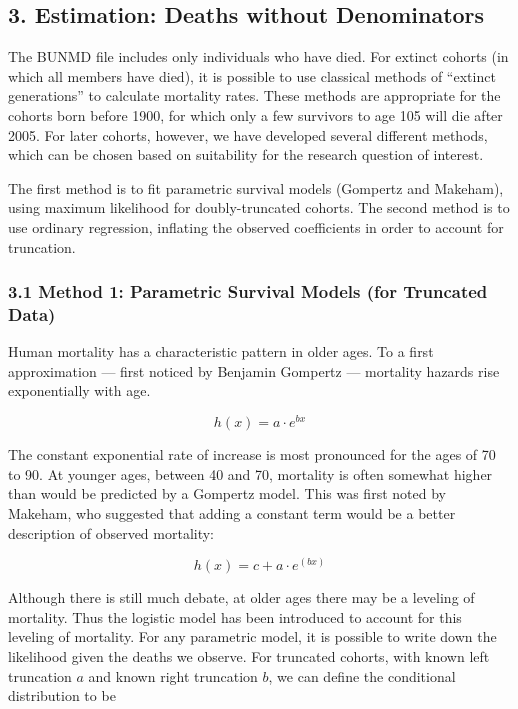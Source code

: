 \documentclass[
  11pt,
]{article}
\begin{document}
\hypertarget{estimation-deaths-without-denominators}{%
\subsection{3. Estimation: Deaths without
Denominators}\label{estimation-deaths-without-denominators}}

The BUNMD file includes only individuals who have died. For extinct
cohorts (in which all members have died), it is possible to use
classical methods of ``extinct generations'' to calculate mortality
rates. These methods are appropriate for the cohorts born before 1900,
for which only a few survivors to age 105 will die after 2005. For later
cohorts, however, we have developed several different methods, which can
be chosen based on suitability for the research question of interest.

The first method is to fit parametric survival models (Gompertz and
Makeham), using maximum likelihood for doubly-truncated cohorts. The
second method is to use ordinary regression, inflating the observed
coefficients in order to account for truncation.

\hypertarget{method-1-parametric-survival-models-for-truncated-data}{%
\subsubsection{3.1 Method 1: Parametric Survival Models (for Truncated
Data)}\label{method-1-parametric-survival-models-for-truncated-data}}

Human mortality has a characteristic pattern in older ages. To a first
approximation --- first noticed by Benjamin Gompertz --- mortality
hazards rise exponentially with age.

\begin{equation}
h(x) = a \cdot e^{bx}
\end{equation}

The constant exponential rate of increase is most pronounced for the
ages of 70 to 90. At younger ages, between 40 and 70, mortality is often
somewhat higher than would be predicted by a Gompertz model. This was
first noted by Makeham, who suggested that adding a constant term would
be a better description of observed mortality:

\begin{equation}
h(x) = c + a \cdot e^{(bx)}
\end{equation}

Although there is still much debate, at older ages there may be a
leveling of mortality. Thus the logistic model has been introduced to
account for this leveling of mortality. For any parametric model, it is
possible to write down the likelihood given the deaths we observe. For
truncated cohorts, with known left truncation \(a\) and known right
truncation \(b\), we can define the conditional distribution to be
\end{document}
